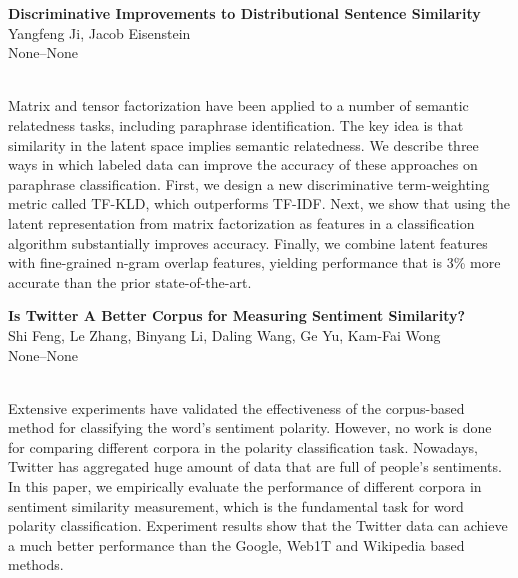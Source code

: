 \documentclass[twoside,makeidx]{book}
\begin{document}
\par\vspace{2em}\noindent%
\begin{minipage}{\linewidth}%
\begin{center}
\textbf{\normalsize Discriminative Improvements to Distributional Sentence Similarity}\\
\normalsize  Yangfeng Ji,  Jacob Eisenstein\\
{\small None--None}\\
\end{center}
\end{minipage}\\[0.5em]
\nopagebreak%
\noindent%
{\small Matrix and tensor factorization have been applied to a number of semantic relatedness tasks, including paraphrase identification. The key idea is that similarity in the latent space implies semantic relatedness. We describe three ways in which labeled data can improve the accuracy of these approaches on paraphrase classification.  First, we design a new discriminative term-weighting metric called TF-KLD, which outperforms TF-IDF. Next, we show that using the latent representation from matrix factorization as features in a classification algorithm substantially improves accuracy. Finally, we combine latent features with fine-grained n-gram overlap features, yielding performance that is 3\% more accurate than the prior state-of-the-art.}
\par\vspace{2em}\noindent%
\begin{minipage}{\linewidth}%
\begin{center}
\textbf{\normalsize Is Twitter A Better Corpus for Measuring Sentiment Similarity?}\\
\normalsize  Shi Feng,  Le Zhang,  Binyang Li,  Daling Wang,  Ge Yu,  Kam-Fai Wong\\
{\small None--None}\\
\end{center}
\end{minipage}\\[0.5em]
\nopagebreak%
\noindent%
{\small Extensive experiments have validated the effectiveness of the corpus-based method for classifying the word's sentiment polarity. However, no work is done for comparing different corpora in the polarity classification task. Nowadays, Twitter has aggregated huge amount of data that are full of people's sentiments. In this paper, we empirically evaluate the performance of different corpora in sentiment similarity measurement, which is the fundamental task for word polarity classification. Experiment results show that the Twitter data can achieve a much better performance than the Google, Web1T and Wikipedia based methods.}
\end{document}

